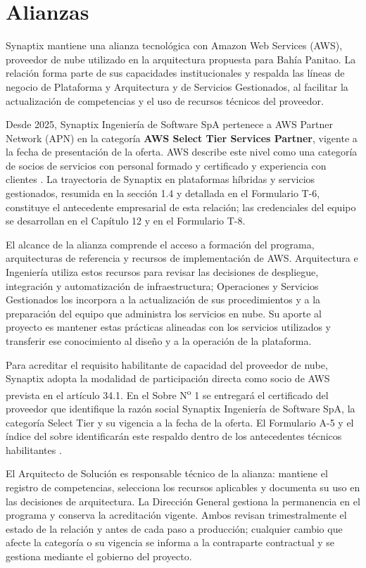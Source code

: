 \section{Alianzas}

Synaptix mantiene una alianza tecnológica con Amazon Web Services (AWS), proveedor de nube utilizado en la arquitectura propuesta para Bahía Panitao. La relación forma parte de sus capacidades institucionales y respalda las líneas de negocio de Plataforma y Arquitectura y de Servicios Gestionados, al facilitar la actualización de competencias y el uso de recursos técnicos del proveedor.

Desde 2025, Synaptix Ingeniería de Software SpA pertenece a AWS Partner Network (APN) en la categoría \textbf{AWS Select Tier Services Partner}, vigente a la fecha de presentación de la oferta. AWS describe este nivel como una categoría de socios de servicios con personal formado y certificado y experiencia con clientes \parencite{aws-partner-tiers}. La trayectoria de Synaptix en plataformas híbridas y servicios gestionados, resumida en la sección 1.4 y detallada en el Formulario T-6, constituye el antecedente empresarial de esta relación; las credenciales del equipo se desarrollan en el Capítulo 12 y en el Formulario T-8.

El alcance de la alianza comprende el acceso a formación del programa, arquitecturas de referencia y recursos de implementación de AWS. Arquitectura e Ingeniería utiliza estos recursos para revisar las decisiones de despliegue, integración y automatización de infraestructura; Operaciones y Servicios Gestionados los incorpora a la actualización de sus procedimientos y a la preparación del equipo que administra los servicios en nube. Su aporte al proyecto es mantener estas prácticas alineadas con los servicios utilizados y transferir ese conocimiento al diseño y a la operación de la plataforma.

Para acreditar el requisito habilitante de capacidad del proveedor de nube, Synaptix adopta la modalidad de participación directa como socio de AWS prevista en el artículo 34.1. En el Sobre N\textsuperscript{o} 1 se entregará el certificado del proveedor que identifique la razón social Synaptix Ingeniería de Software SpA, la categoría Select Tier y su vigencia a la fecha de la oferta. El Formulario A-5 y el índice del sobre identificarán este respaldo dentro de los antecedentes técnicos habilitantes \parencite[arts.~34.1 y 39, numeral~4, pp.~22 y 25]{bases-admin}.

El Arquitecto de Solución es responsable técnico de la alianza: mantiene el registro de competencias, selecciona los recursos aplicables y documenta su uso en las decisiones de arquitectura. La Dirección General gestiona la permanencia en el programa y conserva la acreditación vigente. Ambos revisan trimestralmente el estado de la relación y antes de cada paso a producción; cualquier cambio que afecte la categoría o su vigencia se informa a la contraparte contractual y se gestiona mediante el gobierno del proyecto.


